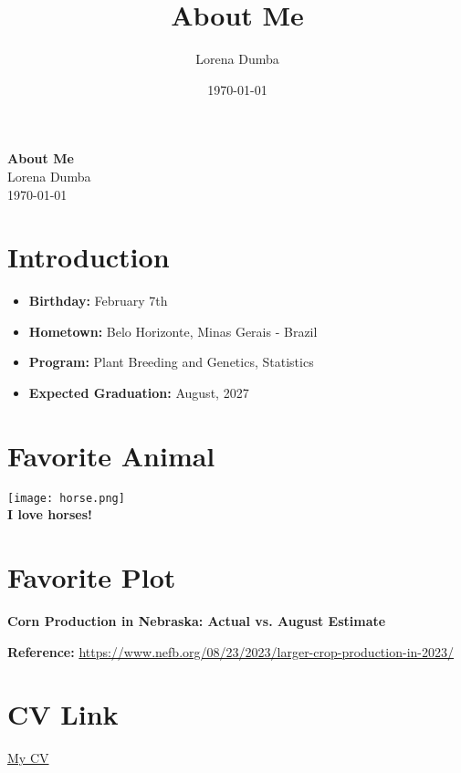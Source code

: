\documentclass{article}
\title{About Me}
\author{Lorena Dumba}
\date{\today}
\begin{document}
\begin{center}
    \huge{\textbf{About Me}}\\
    \vspace{1cm}
    \Large{Lorena Dumba}\\
    \vspace{0.5cm}
    \large{\today}
\end{center}
\newpage

\section*{Introduction}
\begin{itemize}
    \item \textbf{Birthday:} February 7th
    \item \textbf{Hometown:} Belo Horizonte, Minas Gerais - Brazil
    \item \textbf{Program:} Plant Breeding and Genetics, Statistics
    \item \textbf{Expected Graduation:} August, 2027
\end{itemize}
\newpage

\section*{Favorite Animal}
\begin{center}
    \texttt{[image: horse.png]}\\
    \vspace{0.5cm}
    \textbf{I love horses!}
\end{center}
\newpage

\section*{Favorite Plot}

\begin{center}
    \textbf{Corn Production in Nebraska: Actual vs. August Estimate}
\end{center}

\begin{figure}[h!]
    \centering
\end{figure}

\begin{center}
    \textbf{Reference:} \url{https://www.nefb.org/08/23/2023/larger-crop-production-in-2023/}
\end{center}
\newpage

\section*{CV Link}
\begin{center}
    \href{CV.pdf}{My CV}
\end{center}
\end{document}
